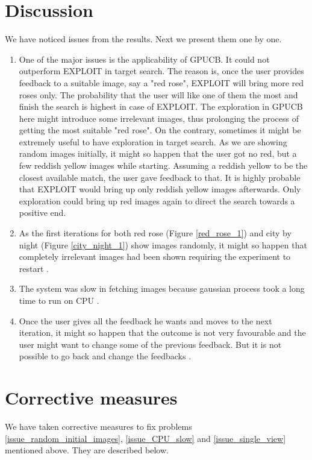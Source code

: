 \documentclass[english]{tktltiki}
\begin{document}
\section{Discussion}

We have noticed issues from the results. Next we present them one by one.

\begin{enumerate}
	\item One of the major issues is the applicability of GPUCB. It could not outperform EXPLOIT in target search. The reason is, once the user provides feedback to a suitable image, say a "red rose", EXPLOIT will bring more red roses only. The probability that the user will like one of them the most and finish the search is highest in case of EXPLOIT. The exploration in GPUCB here might introduce some irrelevant images, thus prolonging the process of getting the most suitable "red rose". On the contrary, sometimes it might be extremely useful to have exploration in target search. As we are showing random images initially, it might so happen that the user got no red, but a few reddish yellow images while starting. Assuming a reddish yellow to be the closest available match, the user gave feedback to that. It is highly probable that EXPLOIT would bring up only reddish yellow images afterwards. Only exploration could bring up red images again to direct the search towards a positive end.
	\item As the first iterations for both red rose (Figure \ref{red_rose_1}) and city by night (Figure \ref{city_night_1}) show images randomly, it might so happen that completely irrelevant images had been shown requiring the experiment to restart \label{issue_random_initial_images}.
	\item The system was slow in fetching images because gaussian process took a long time to run on CPU \label{issue_CPU_slow}.
	\item Once the user gives all the feedback he wants and moves to the next iteration, it might so happen that the outcome is not very favourable and the user might want to change some of the previous feedback. But it is not possible to go back and change the feedbacks \label{issue_single_view}.
\end{enumerate}


\section{Corrective measures}

We have taken corrective measures to fix problems \ref{issue_random_initial_images}, \ref{issue_CPU_slow} and \ref{issue_single_view} mentioned above. They are described below.
\end{document}
